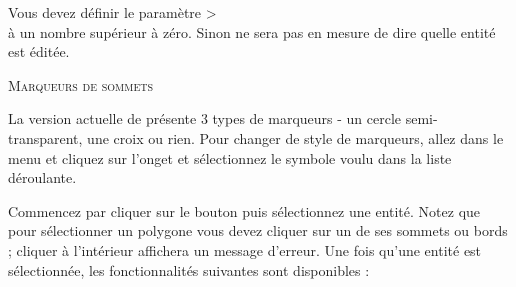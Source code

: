 Vous devez définir le paramètre >
 \\ \arrow {} \arrow 
{} à un nombre supérieur à zéro. Sinon \qg 
ne sera pas en mesure de dire quelle entité est éditée.

\begin{Tip}[ht]\caption{\textsc{Marqueurs de sommets}}
La version actuelle de \qg présente 3 types de marqueurs - un cercle 
semi-transparent, une croix ou rien. Pour changer de style de marqueurs, allez 
dans le menu  et cliquez sur l'onget 
 et sélectionnez le symbole voulu dans la liste déroulante.
\end{Tip}


Commencez par cliquer sur le bouton  
puis sélectionnez une entité. Notez que pour sélectionner un polygone vous devez 
cliquer sur un de ses sommets ou bords ; cliquer à l'intérieur affichera un 
message d'erreur. Une fois qu'une entité est sélectionnée, les fonctionnalités 
suivantes sont disponibles :

